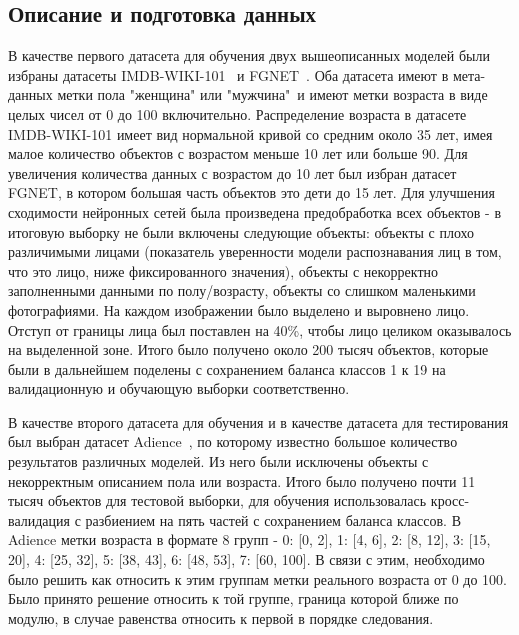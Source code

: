 \subsection{Описание и подготовка данных}\label{subsec:описание-данных}
В качестве первого датасета для обучения двух вышеописанных моделей были избраны датасеты IMDB-WIKI-101~\cite{imdb_db} и FGNET~\cite{fgnet}.
Оба датасета имеют в мета-данных метки пола "женщина" или "мужчина"\, и имеют метки возраста в виде целых чисел от 0 до 100 включительно.
Распределение возраста в датасете IMDB-WIKI-101 имеет вид нормальной кривой со средним около 35 лет,
имея малое количество объектов с возрастом меньше 10 лет или больше 90.
Для увеличения количества данных с возрастом до 10 лет был избран датасет FGNET, в котором большая часть объектов это дети до 15 лет.
Для улучшения сходимости нейронных сетей была произведена предобработка всех объектов -
в итоговую выборку не были включены следующие объекты:
объекты с плохо различимыми лицами (показатель уверенности модели распознавания лиц в том, что это лицо, ниже фиксированного значения),
объекты с некорректно заполненными данными по полу/возрасту,
объекты со слишком маленькими фотографиями.
На каждом изображении было выделено и выровнено лицо.
Отступ от границы лица был поставлен на 40\%, чтобы лицо целиком оказывалось на выделенной зоне.
Итого было получено около 200 тысяч объектов, которые были в дальнейшем поделены
с сохранением баланса классов 1 к 19 на валидационную и обучающую выборки соответственно.
\par В качестве второго датасета для обучения и в качестве датасета для тестирования был выбран датасет Adience~\cite{adience}, по которому известно большое количество результатов различных моделей.
Из него были исключены объекты с некорректным описанием пола или возраста.
Итого было получено почти 11 тысяч объектов для тестовой выборки, для обучения использовалась кросс-валидация с разбиением на пять частей с сохранением баланса классов.
В Adience метки возраста в формате 8 групп - 0: [0, 2], 1: [4, 6], 2: [8, 12], 3: [15, 20], 4: [25, 32], 5: [38, 43], 6: [48, 53], 7: [60, 100].
В связи с этим, необходимо было решить как относить к этим группам метки реального возраста от 0 до 100.
Было принято решение относить к той группе, граница которой ближе по модулю, в случае равенства относить к первой в порядке следования.

